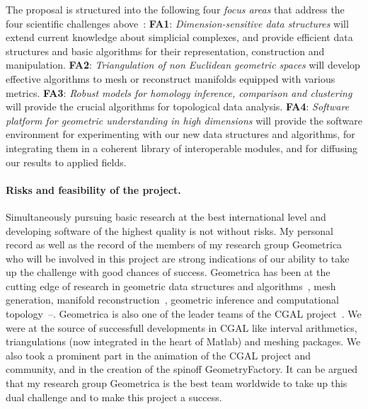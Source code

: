 The proposal is structured into the following four {\em focus areas} that address the four scientific challenges above~:
{\bf FA1}:  {\em Dimension-sensitive data  structures} will extend current knowledge about simplicial complexes, and  provide efficient data structures and basic algorithms for their representation, construction and manipulation. 
  {\bf FA2}:  {\em Triangulation of non Euclidean geometric spaces} will develop effective algorithms to mesh or reconstruct manifolds equipped with various metrics.   {\bf FA3}: {\em Robust models for homology inference, comparison and  clustering} will provide the crucial  algorithms for topological data analysis.
 {\bf FA4}:  {\em  Software platform for geometric understanding in high dimensions} will provide the software environment for experimenting with our new data structures and algorithms, for integrating them in a coherent library of interoperable modules, and for diffusing our results to applied fields. 

\paragraph{Risks and feasibility of the project.} 
Simultaneously pursuing basic research at the best international level and developing software of the highest quality is not without risks. %
My personal record as well as the record of the members of my research group Geometrica who will be involved in this project are strong indications of our ability to take up the challenge with good chances of success.  Geometrica has been at the cutting edge of research in geometric data structures and algorithms~\cite{geometrica-ecg-book,by-ag-98}, mesh generation, manifold reconstruction~\cite{geometrica-7142i,geometrica-bgo-09}, geometric inference and computational topology~\cite{geometrica-ccl09}--\cite{geometrica-cseh-07}. Geometrica is also one of the leader teams of the CGAL project~\cite{cgal}.  We were at the source of successfull developments in CGAL like interval arithmetics, triangulations (now integrated in the heart of Matlab) and meshing packages. We also took a prominent part in the animation of the CGAL project and community, and in the creation of the spinoff GeometryFactory. It can be argued that  my research group Geometrica is the best team worldwide to take up this dual challenge and to make this project a success. 


